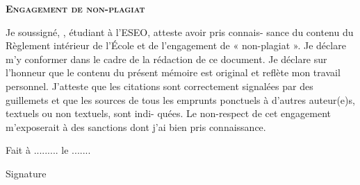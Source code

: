 \documentclass[a4paper]{article}
\begin{document}
\begin{titlepage}
	\vspace*{0.75cm}

	\SupervisorSection

	\TutorSection
	\vspace{2cm}

\end{titlepage}

\fancyhead[C]{\@title}
\fancyfoot[L]{\SemesterSection}
\fancyfoot[R]{\CycleSection}
\fancyfoot[C]{\thepage}

\newpage
\large{\textsc{\textbf{Engagement de non-plagiat}}}
\vspace*{0.5cm}

Je soussigné, \Author, étudiant à l'ESEO, atteste avoir pris connais-
sance du contenu du Règlement intérieur de l'École et de l'engagement de « non-plagiat
». Je déclare m'y conformer dans le cadre de la rédaction de ce document. Je déclare sur
l'honneur que le contenu du présent mémoire est original et reflète mon travail personnel.
J'atteste que les citations sont correctement signalées par des guillemets et que les sources
de tous les emprunts ponctuels à d'autres auteur(e)s, textuels ou non textuels, sont indi-
quées. Le non-respect de cet engagement m'exposerait à des sanctions dont j'ai bien pris
connaissance.

Fait à ......... le .......

Signature
\end{document}
